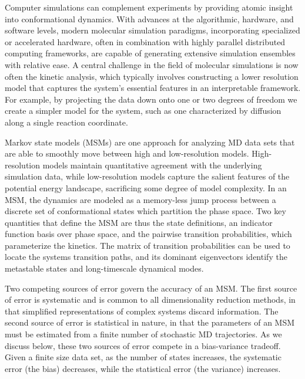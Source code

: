 \documentclass[journal=jpcbfk, layout=traditional, manuscript=article]{achemso}
\begin{document}
Computer simulations can complement experiments by providing atomic insight into conformational dynamics. With advances at the algorithmic, hardware, and software levels, modern molecular simulation paradigms, incorporating specialized or accelerated hardware, often in combination with highly parallel distributed computing frameworks, are capable of generating extensive simulation ensembles with relative ease\cite{Gotz2012Routine, Eastman2013OpenMM, Shirts2000Screen, Shaw2009Millisecond, Hess2008PLINCS, Buch2010High}. A central challenge in the field of molecular simulations is now often the kinetic analysis, which typically involves constructing a lower resolution model that captures the system's essential features in an interpretable framework\cite{Freddolino2010Challenges, Lane2013Milliseconds}. For example, by projecting the data down onto one or two degrees of freedom we create a simpler model for the system, such as one characterized by diffusion along a single reaction coordinate\cite{Best2010Coordinate}.

Markov state models (MSMs) are one approach for analyzing MD data sets that are able to smoothly move between high and low-resolution models\cite{Chodera2007Automatic, Prinz2011Markov, Beauchamp2012Simple, Bowman2013Quantitative}. High-resolution  models maintain quantitative agreement with the underlying simulation data, while low-resolution models capture the salient features of the potential energy landscape, sacrificing some degree of model complexity. In an MSM, the dynamics are modeled as a memory-less jump process between a discrete set of conformational states which partition the phase space. Two key quantities that define the MSM are thus the state definitions, an indicator function basis over phase space, and the pairwise transition probabilities, which parameterize the kinetics. The matrix of transition probabilities can be used to locate the systems transition paths, and its dominant eigenvectors identify the metastable states and long-timescale dynamical modes\cite{Weinan2006Towards, Deuflhard2000Identification}.

Two competing sources of error govern the accuracy of an MSM. The first source of error is systematic and is common to all dimensionality reduction methods, in that simplified representations of complex systems discard information. The second source of error is statistical in nature, in that the parameters of an MSM must be estimated from a finite number of stochastic MD trajectories. As we discuss below, these two sources of error compete in a bias-variance tradeoff\cite{Sammut2010Encyclopedia}. Given a finite size data set, as the number of states increases, the systematic error (the bias) decreases, while the statistical error (the variance) increases.
\end{document}
